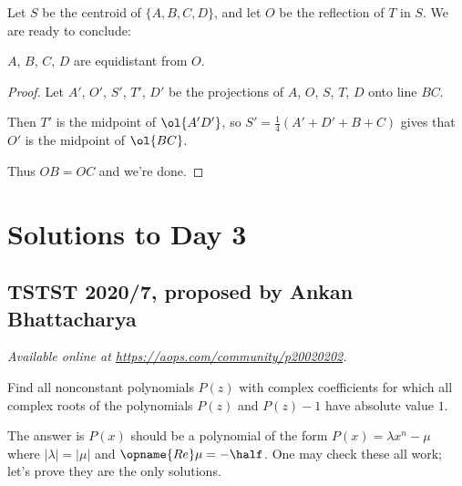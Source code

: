 \documentclass[11pt]{scrartcl}
\begin{document}
Let $S$ be the centroid of $\{A, B, C, D\}$,
and let $O$ be the reflection of $T$ in $S$.
We are ready to conclude:
\begin{claim*}
  $A$, $B$, $C$, $D$ are equidistant from $O$.
\end{claim*}
\begin{proof}
  Let $A'$, $O'$, $S'$, $T'$, $D'$
  be the projections of $A$, $O$, $S$, $T$, $D$
  onto line $BC$.

  Then $T'$ is the midpoint of $\ol{A'D'}$,
  so $S' = \tfrac14(A'+D'+B+C)$
  gives that $O'$ is the midpoint of $\ol{BC}$.

  Thus $OB = OC$ and we're done.
\end{proof}
\pagebreak

\section{Solutions to Day 3}
\subsection{TSTST 2020/7, proposed by Ankan Bhattacharya}
\textsl{Available online at \url{https://aops.com/community/p20020202}.}
\begin{mdframed}[style=mdpurplebox,frametitle={Problem statement}]
Find all nonconstant polynomials $P(z)$ with complex coefficients
for which all complex roots of the polynomials
$P(z)$ and $P(z)-1$ have absolute value $1$.
\end{mdframed}
The answer is $P(x)$ should be a polynomial
of the form $P(x) = \lambda x^n - \mu$
where $|\lambda| = |\mu|$ and $\opname{Re} \mu = -\half$.
One may check these all work;
let's prove they are the only solutions.
\end{document}
